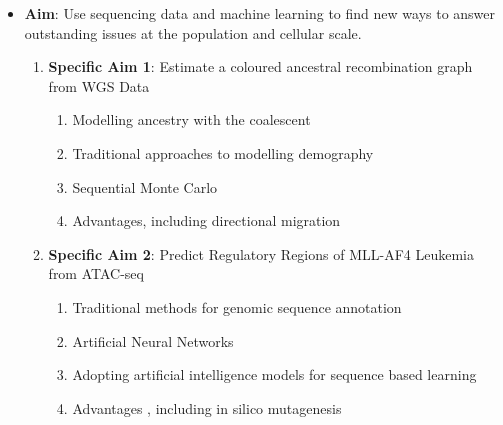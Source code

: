 \begin{itemize}
    \item \textbf{Aim}: Use sequencing data and machine learning to find new ways to answer outstanding issues at the population and cellular scale.
    \begin{enumerate}
        \item \textbf{Specific Aim 1}: Estimate a coloured ancestral recombination graph from WGS Data
        \begin{enumerate}
            \item Modelling ancestry with the coalescent
            \item Traditional approaches to modelling demography
            \item Sequential Monte Carlo
            \item Advantages, including directional migration
        \end{enumerate}
        \item \textbf{Specific Aim 2}: Predict Regulatory Regions of MLL-AF4 Leukemia from ATAC-seq
        \begin{enumerate}
            \item Traditional methods for genomic sequence annotation
            \item Artificial Neural Networks
            \item Adopting artificial intelligence models for sequence based learning
            \item Advantages , including in silico mutagenesis 
        \end{enumerate}
    \end{enumerate}
\end{itemize}

